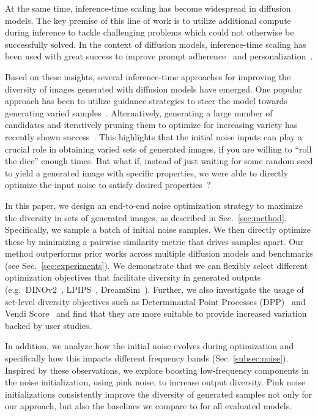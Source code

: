\documentclass[10pt,twocolumn,letterpaper]{article}
\begin{document}
At the same time, inference-time scaling has become widespread in diffusion models. The key premise of this line of work is to utilize additional compute during inference to tackle challenging problems which could not otherwise be successfully solved. In the context of diffusion models, inference-time scaling has been used with great success to improve prompt adherence~\cite{doodl,reno,novack2024dittodiffusioninferencetimetoptimization} and personalization~\cite{dreambooth,hyperdreambooth}.

Based on these insights, several inference-time approaches for improving the diversity of images generated with diffusion models have emerged. One popular approach has been to utilize guidance strategies to steer the model towards generating varied samples~\cite{particle,singh2024negative,sadat2023cads}.
Alternatively, generating a large number of candidates and iteratively pruning them to optimize for increasing variety has recently shown success~\cite{gi}. 
This highlights that the initial noise inputs can play a crucial role in obtaining varied sets of generated images, if you are willing to ``roll the dice'' enough times. But what if, instead of just waiting for some random seed to yield a generated image with specific properties, we were able to directly optimize the input noise to satisfy desired properties~\cite{reno}?

In this paper, we design an end-to-end noise optimization strategy to maximize the diversity in sets of generated images, as described in Sec.~\ref{sec:method}. Specifically, we sample a batch of initial noise samples. We then directly optimize these by minimizing a pairwise similarity metric that drives samples apart. Our method outperforms prior works across multiple diffusion models and benchmarks (see Sec.~\ref{sec:experiments}). We demonstrate that we can flexibly select different optimization objectives that facilitate diversity in generated outputs (e.g.\ DINOv2~\cite{dinov2}, LPIPS~\cite{lpips}, DreamSim~\cite{fu2023dreamsim}). Further, we also investigate the usage of set-level diversity objectives such as Determinantal Point Processes (DPP)~\cite{elfeki2019gdpp} and Vendi Score~\cite{friedman2022vendi} and find that they are more suitable to provide increased variation backed by user studies. 


In addition, we analyze how the initial noise evolves during optimization and specifically how this impacts different frequency bands (Sec. \ref{subsec:noise}). Inspired by these observations, we explore boosting low-frequency components in the noise initialization, using pink noise, to increase output diversity. Pink noise initializations consistently improve the diversity of generated samples not only for our approach, but also the baselines we compare to for all evaluated models.
\end{document}
